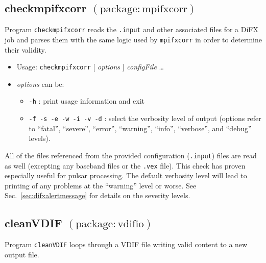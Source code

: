 
\subsection{checkmpifxcorr {\small $\mathrm{(package: mpifxcorr)}$}}

Program {\tt checkmpifxcorr} reads the {\tt .input} and other associated files for a DiFX job and parses them with the same logic used by {\tt mpifxcorr} in order to determine their validity.

\begin{itemize}
\item[] Usage: {\tt checkmpifxcorr}  $[$ {\em options} $]$ {\em configFile} \ldots
\item[] {\em options} can be:
\begin{itemize}
\item[] {\tt -h} : print usage information and exit
\item[] {\tt -f -s -e -w -i -v -d} : select the verbosity level of output (options refer to ``fatal'', ``severe'', ``error'', ``warning'', ``info'', ``verbose'', and ``debug'' levels).
\end{itemize}
\end{itemize}

All of the files referenced from the provided configuration ({\tt .input}) files are read as well (excepting any baseband files or the {\tt .vex} file).
This check has proven especially useful for pulsar processing.
The default verbosity level will lead to printing of any problems at the ``warning'' level or worse.
See Sec.~\ref{sec:difxalertmessage} for details on the severity levels.






\subsection{cleanVDIF {\small $\mathrm{(package: vdifio)}$} \label{sec:printVDIF}}

Program {\tt cleanVDIF} loops through a VDIF file writing valid content to a new output file.

